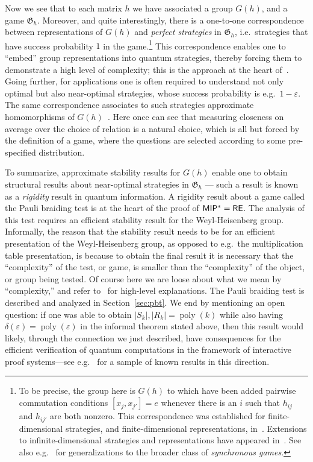 \documentclass[11pt]{article}
\theoremstyle{definition}
\DeclareMathOperator{\poly}{poly}
\newcommand{\eps}{\varepsilon}
\newcommand{\game}{\mathfrak{G}}
\begin{document}
Now we see that to each matrix $h$ we have associated a group $G(h)$, and a game $\game_h$. Moreover, and quite interestingly, there is a one-to-one correspondence between representations of $G(h)$ and \emph{perfect strategies} in $\game_h$, i.e.\ strategies that have success probability $1$ in the game.\footnote{To be precise, the group here is $G(h)$ to which have been added pairwise commutation conditions $[x_j,x_{j'}]=e$ whenever there is an $i$ such that $h_{ij}$ and $h_{ij'}$ are both nonzero. This correspondence was established for finite-dimensional strategies, and finite-dimensional representations, in~\cite{cleve2014characterization}. Extensions to infinite-dimensional strategies and representations have appeared in~\cite{cleve2017perfect}. See also e.g.~\cite{kim2018synchronous} for generalizations to the broader class of \emph{synchronous games}.}
This correspondence enables one to ``embed'' group representations into quantum strategies, thereby forcing them to demonstrate a high level of complexity; this is the approach at the heart of~\cite{slofstra2019set}. Going further, for applications one is often required to understand not only optimal but also near-optimal strategies, whose success probability is e.g.\ $1-\eps$. The same correspondence associates to such strategies approximate homomorphisms of $G(h)$~\cite{slofstra2018entanglement}. Here once can see that measuring closeness on average over the choice of relation is a natural choice, which is all but forced by the definition of a game, where the questions are selected according to some pre-specified distribution. 

To summarize, approximate stability results for $G(h)$ enable one to obtain structural results about near-optimal strategies in $\game_h$ --- such a result is known as a \emph{rigidity} result in quantum information. A rigidity result about a game called the Pauli braiding test is at the heart of the proof of $\sf MIP^* = \sf RE$. The analysis of this test requires an efficient stability result for the Weyl-Heisenberg group. Informally, the reason that the stability result needs to be for an efficient presentation of the Weyl-Heisenberg group, as opposed to e.g.\ the multiplication table presentation, is because to obtain the final result it is necessary that the ``complexity'' of the test, or game, is smaller than the ``complexity'' of the object, or group being tested. Of course here we are loose about what we mean by ``complexity,'' and refer to~\cite{ji2021mip,vidickmip} for high-level explanations. The Pauli braiding test is described and analyzed in Section~\ref{sec:pbt}. We end by mentioning an open question: if one was able to obtain $|S_k|,|R_k|=\poly(k)$ while also having $\delta(\eps)=\poly(\eps)$ in the informal theorem stated above, then this result would likely, through the connection we just described, have consequences for the efficient verification of quantum computations in the framework of interactive proof systems---see e.g.~\cite{coladangelo2019verifier,natarajan2023bounding} for a sample of known results in this direction. 
\end{document}
